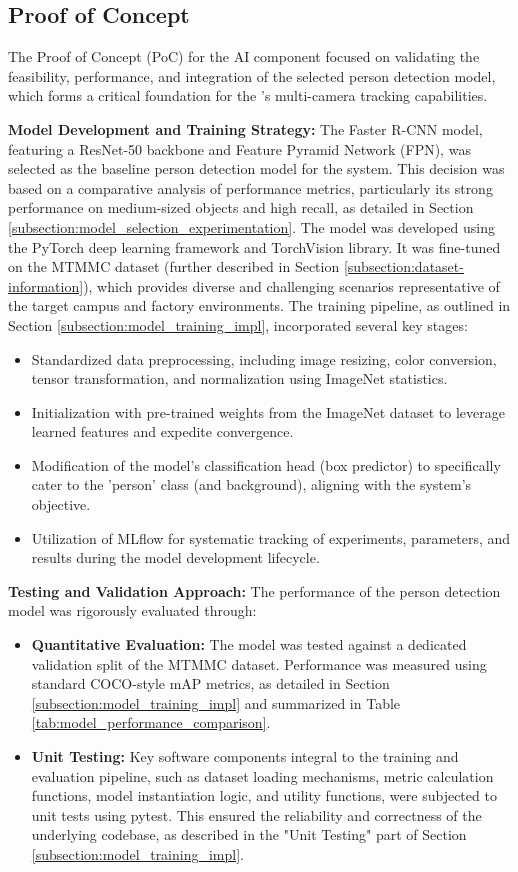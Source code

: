 \subsection{Proof of Concept}
\label{subsection:poc}
The Proof of Concept (PoC) for the AI component focused on validating the feasibility, performance, and integration of the selected person detection model, which forms a critical foundation for the \usevar{\srsTitle}'s multi-camera tracking capabilities.

\textbf{Model Development and Training Strategy:}
The Faster R-CNN model, featuring a ResNet-50 backbone and Feature Pyramid Network (FPN), was selected as the baseline person detection model for the system. This decision was based on a comparative analysis of performance metrics, particularly its strong performance on medium-sized objects and high recall, as detailed in Section \ref{subsection:model_selection_experimentation}.
The model was developed using the PyTorch deep learning framework and TorchVision library. It was fine-tuned on the MTMMC dataset (further described in Section \ref{subsection:dataset-information}), which provides diverse and challenging scenarios representative of the target campus and factory environments. The training pipeline, as outlined in Section \ref{subsection:model_training_impl}, incorporated several key stages:
\begin{itemize}
    \item Standardized data preprocessing, including image resizing, color conversion, tensor transformation, and normalization using ImageNet statistics.
    \item Initialization with pre-trained weights from the ImageNet dataset to leverage learned features and expedite convergence.
    \item Modification of the model's classification head (box predictor) to specifically cater to the 'person' class (and background), aligning with the system's objective.
    \item Utilization of MLflow for systematic tracking of experiments, parameters, and results during the model development lifecycle.
\end{itemize}

\textbf{Testing and Validation Approach:}
The performance of the person detection model was rigorously evaluated through:
\begin{itemize}
    \item \textbf{Quantitative Evaluation:} The model was tested against a dedicated validation split of the MTMMC dataset. Performance was measured using standard COCO-style mAP metrics, as detailed in Section \ref{subsection:model_training_impl} and summarized in Table \ref{tab:model_performance_comparison}.
    \item \textbf{Unit Testing:} Key software components integral to the training and evaluation pipeline, such as dataset loading mechanisms, metric calculation functions, model instantiation logic, and utility functions, were subjected to unit tests using pytest. This ensured the reliability and correctness of the underlying codebase, as described in the "Unit Testing" part of Section \ref{subsection:model_training_impl}.
\end{itemize}

